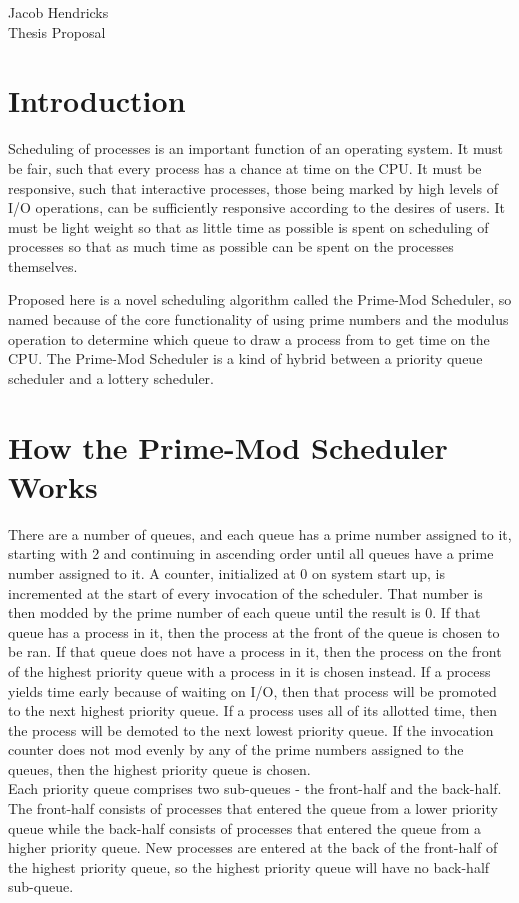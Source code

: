 \documentclass[12pt]{article}
\begin{document}
	
	\noindent Jacob Hendricks \\ Thesis Proposal
	
	\section*{Introduction}
	Scheduling of processes is an important function of an operating system.
	It must be fair, such that every process has a chance at time on the CPU.
	It must be responsive, such that interactive processes, those being marked by high levels of I/O operations, can be sufficiently responsive according to the desires of users.
	It must be light weight so that as little time as possible is spent on scheduling of processes so that as much time as possible can be spent on the processes themselves.
	
	Proposed here is a novel scheduling algorithm called the Prime-Mod Scheduler, so named because of the core functionality of using prime numbers and the modulus operation to determine which queue to draw a process from to get time on the CPU.
	The Prime-Mod Scheduler is a kind of hybrid between a priority queue scheduler and a lottery scheduler.
	
	\section*{How the Prime-Mod Scheduler Works}
	There are a number of queues, and each queue has a prime number assigned to it, starting with 2 and continuing in ascending order until all queues have a prime number assigned to it.
	A counter, initialized at 0 on system start up, is incremented at the start of every invocation of the scheduler. 
	That number is then modded by the prime number of each queue until the result is 0.
	If that queue has a process in it, then the process at the front of the queue is chosen to be ran.
	If that queue does not have a process in it, then the process on the front of the highest priority queue with a process in it is chosen instead.
	If a process yields time early because of waiting on I/O, then that process will be promoted to the next highest priority queue.
	If a process uses all of its allotted time, then the process will be demoted to the next lowest priority queue.
	If the invocation counter does not mod evenly by any of the prime numbers assigned to the queues, then the highest priority queue is chosen.\\
	
	
	Each priority queue comprises two sub-queues - the front-half and the back-half.
	The front-half consists of processes that entered the queue from a lower priority queue while the back-half consists of processes that entered the queue from a higher priority queue.
	New processes are entered at the back of the front-half of the highest priority queue, so the highest priority queue will have no back-half sub-queue. \\
	
\end{document}
